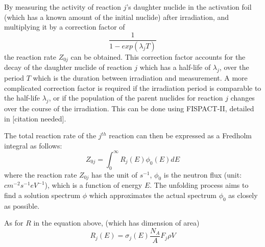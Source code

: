 \documentclass[a4paper, 12pt]{article}
\begin{document}
By measuring the activity of reaction $j$'s daughter nuclide in the activation foil (which has a known amount of the initial nuclide) after irradiation, and multiplying it by a correction factor of 
\begin{equation}
    \frac{1}{{1-exp({\lambda_j}T)}}
\end{equation}
the reaction rate $Z_{0j}$ can be obtained. This correction factor accounts for the decay of the daughter nuclide of reaction $j$ which has a half-life of $\lambda_j$, over the period $T$ which is the duration between irradiation and measurement. A more complicated correction factor is required if the irradiation period is comparable to the half-life $\lambda_j$, or if the population of the parent nuclides for reaction $j$ changes over the course of the irradiation. This can be done using FISPACT-II, detailed in [citation needed].

The total reaction rate of the $j^{th}$ reaction can then be expressed as a Fredholm integral as follows:
\begin{equation}
    Z_{0j}= \int_{0}^{\infty} R_{j}(E) \phi_0(E) {d}E
\end{equation}
where the reaction rate $Z_{0j}$ has the unit of $s^{-1}$,
$\phi_0$ is the neutron flux (unit: $cm^{-2} s^{-1} eV^{-1}$), which is a function of energy $E$. The unfolding process aims to find a solution spectrum $\phi$ which approximates the actual spectrum $\phi_0$ as closely as possible. 


As for $R$ in the equation above, (which has dimension of area)
\begin{equation}
    R_j(E) =\sigma_{j}(E) \frac{N_A } {A} F_j \rho V
\end{equation}
\end{document}
